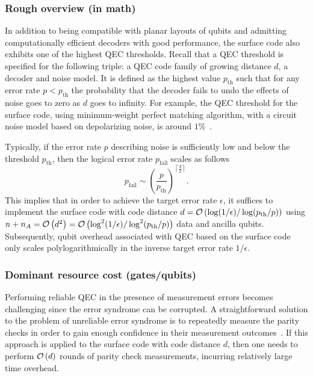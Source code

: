 \begin{refsection}

\subsubsection*{Rough overview (in math)}


In addition to being compatible with planar layouts of qubits and admitting computationally efficient decoders with good performance, the surface code also exhibits one of the highest QEC thresholds.
Recall that a QEC threshold is specified for the following triple: a QEC code family of growing distance $d$, a decoder and noise model.
It is defined as the highest value $p_\text{th}$ such that for any error rate $p< p_\text{th}$ the probability that the decoder fails to undo the effects of noise goes to zero as $d$ goes to infinity. 
For example, the QEC threshold for the surface code, using minimum-weight perfect matching algorithm, with a circuit noise model based on depolarizing noise, is around $1\%$~\cite{wang2011surfaceCodeErrorRates,higgott2023improvedDecodingCircuitNoise}.


Typically, if the error rate $p$ describing noise is sufficiently low and below the threshold $p_\mathrm{th}$, then the logical error rate $p_\mathrm{fail}$ scales as follows
\begin{equation}
p_\mathrm{fail} \sim \left(\frac{p}{p_\mathrm{th}}\right)^{\left\lceil \frac{d}{2}\right\rceil}.
\end{equation}
This implies that in order to achieve the target error rate $\epsilon$, it suffices to implement the surface code with code distance
$d = \mathcal{O}\left( \log(1/\epsilon) / \log(p_\text{th}/p) \right)$ using $n + n_A = \mathcal{O}\left( d^2 \right) = \mathcal{O}\left( \log^2(1/\epsilon) / \log^2(p_\text{th}/p) \right)$ data and ancilla qubits.
Subsequently, qubit overhead associated with QEC based on the surface code only scales polylogarithmically in the inverse target error rate $1/\epsilon$.



\subsubsection*{Dominant resource cost (gates/qubits)}


Performing reliable QEC in the presence of measurement errors becomes challenging since the error syndrome can be corrupted.
A straightforward solution to the problem of unreliable error syndrome is to repeatedly measure the parity checks in order to gain enough confidence in their measurement outcomes~\cite{shor1996FTQC,dennis2002TopologicalQuantumMemory}.
If this approach is applied to the surface code with code distance $d$, then one needs to perform $\mathcal{O}\left( d \right)$ rounds of parity check measurements, incurring relatively large time overhead.



\end{refsection}
